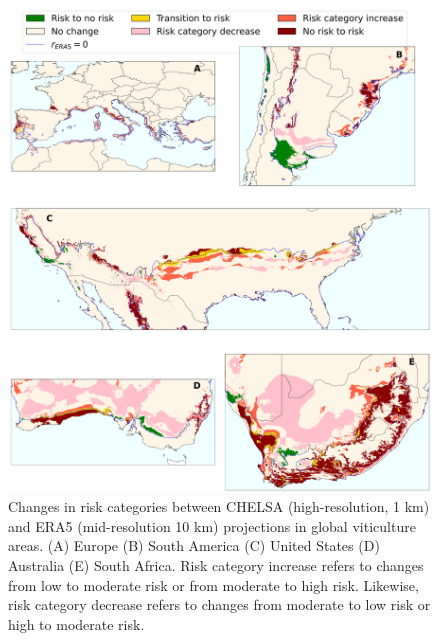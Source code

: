 \begin{figure}[H]
    \centering
    \includegraphics[width=\textwidth]{Figures/ERA5_vs_CHELSA_zones.pdf}
    \caption{Changes in risk categories between CHELSA (high-resolution, 1
        km) and ERA5 (mid-resolution 10 km) projections in global viticulture
        areas.
        (A) Europe (B) South America (C) United States (D) Australia (E) South
        Africa.
        Risk category increase refers to changes from low to moderate risk or
        from
        moderate to high risk. Likewise, risk category decrease refers to
        changes from
        moderate to low risk or high to moderate risk.}
    \label{fig:risk_categories_dif}
\end{figure}

